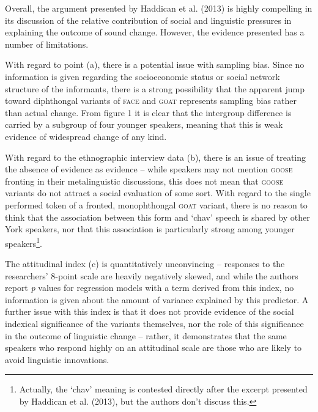 \documentclass{article}
\begin{document}
Overall, the argument presented by Haddican et al. (2013) is highly compelling in its discussion of the relative contribution of social and linguistic pressures in explaining the outcome of sound change. However, the evidence presented has a number of limitations. 

With regard to point (a), there is a potential issue with sampling bias. Since no information is given regarding the socioeconomic status or social network structure of the informants, there is a strong possibility that the apparent jump toward diphthongal variants of \textsc{face} and \textsc{goat} represents sampling bias rather than actual change. From figure 1 it is clear that the intergroup difference is carried by a subgroup of four younger speakers, meaning that this is weak evidence of widespread change of any kind. 

With regard to the ethnographic interview data (b), there is an issue of treating the absence of evidence as evidence -- while speakers may not mention \textsc{goose} fronting in their metalinguistic discussions, this does not mean that \textsc{goose} variants do not attract a social evaluation of some sort. With regard to the single performed token of a fronted, monophthongal \textsc{goat} variant, there is no reason to think that the association between this form and `chav' speech is shared by other York speakers, nor that this association is particularly strong among younger speakers\footnote{Actually, the `chav' meaning is contested directly after the excerpt presented by Haddican et al. (2013), but the authors don't discuss this.}. 

The attitudinal index (c) is quantitatively unconvincing -- responses to the researchers' 8-point scale are heavily negatively skewed, and while the authors report \textit{p} values for regression models with a term derived from this index, no information is given about the amount of variance explained by this predictor. A further issue with this index is that it does not provide evidence of the social indexical significance of the variants themselves, nor the role of this significance in the outcome of linguistic change -- rather, it demonstrates that the same speakers who respond highly on an attitudinal scale are those who are likely to avoid linguistic innovations. %
\newpage
\end{document}
